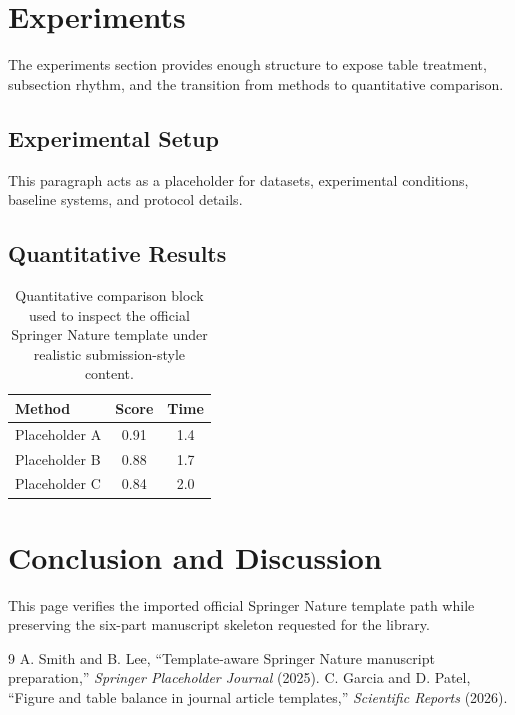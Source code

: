 \documentclass[pdflatex,sn-vancouver-num]{sn-jnl}
\begin{document}
\section{Experiments}
The experiments section provides enough structure to expose table treatment, subsection rhythm, and the transition from methods to quantitative comparison.
\subsection{Experimental Setup}
This paragraph acts as a placeholder for datasets, experimental conditions, baseline systems, and protocol details.
\subsection{Quantitative Results}
\begin{table}[t]
\caption{Quantitative comparison block used to inspect the official Springer Nature template under realistic submission-style content.}
\centering
\begin{tabular}{lcc}
\toprule
Method & Score & Time \\
\midrule
Placeholder A & 0.91 & 1.4 \\
Placeholder B & 0.88 & 1.7 \\
Placeholder C & 0.84 & 2.0 \\
\bottomrule
\end{tabular}
\end{table}
\section{Conclusion and Discussion}
This page verifies the imported official Springer Nature template path while preserving the six-part manuscript skeleton requested for the library.
\begin{thebibliography}{9}
 A. Smith and B. Lee, ``Template-aware Springer Nature manuscript preparation,'' \textit{Springer Placeholder Journal} (2025).
 C. Garcia and D. Patel, ``Figure and table balance in journal article templates,'' \textit{Scientific Reports} (2026).
\end{thebibliography}
\end{document}
